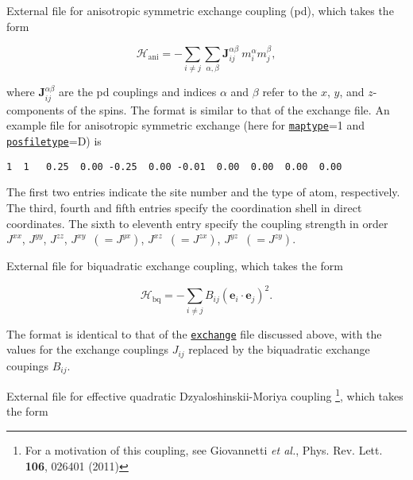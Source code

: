 \documentclass[11pt,fleqn,a4]{book} %
\makeatletter
\newcommand{\litem}[1]{\item[\bfseries#1\index{#1@\texttt{#1}}\label{#1}]}
\newcommand{\rkeyword}[1]{\hyperref[#1]{\texttt{#1}}}
\makeatother
\begin{document}
\begin{description}[leftmargin=!,labelwidth=\widthof{\bfseries fifteenchars}]
\litem{pd} External file for anisotropic symmetric exchange coupling (pd), which takes the form 

\begin{declaration} 
\begin{equation}
\mathcal{H}_{\mathrm{ani}} = -\sum_{i\neq j} \sum_{\alpha,\beta}\mathbf{J}_{ij}^{\alpha \beta} \ m_i^{\alpha} m_j^{\beta},
  \label{pd_ham}
\end{equation}
\end{declaration}

\noindent where $\mathbf{J}_{ij}^{\alpha \beta}$ are the pd couplings and indices $\alpha$ and $\beta$ refer to the $x$, $y$, and $z$-components of the spins. The format is similar to that of the exchange file.  An example file for anisotropic symmetric exchange (here for \rkeyword{maptype}=1 and \rkeyword{posfiletype}=D) is

\begin{fBox} 
\begin{Verbatim}
1  1   0.25  0.00 -0.25  0.00 -0.01  0.00  0.00  0.00  0.00  
\end{Verbatim}
\end{fBox}

The first two entries indicate the site number and the type of atom, respectively. The third, fourth and fifth entries specify the coordination shell in direct coordinates. The sixth to eleventh entry specify the coupling strength in order $J^{xx}$, $J^{yy}$, $J^{zz}$, $J^{xy}$~$(=J^{yx})$, $J^{xz}$~$(=J^{zx})$, $J^{yz}$~$(=J^{zy})$.

\litem{bq} External file for biquadratic exchange coupling, which takes the form  

\begin{declaration}
\begin{equation}
 \mathcal{H}_{\mathrm{bq}} = -\sum_{i\neq j}B_{ij} \left( \mathbf{e}_i\cdot\mathbf{e}_j \right)^2.
  \label{bq_ham}
\end{equation}
\end{declaration}

\noindent The format is identical to that of the \rkeyword{exchange} file discussed above, with the values for the exchange couplings $J_{ij}$ replaced by the biquadratic exchange coupings $B_{ij}$. 

\litem{biqdm} External file for effective quadratic Dzyaloshinskii-Moriya coupling \footnote{For a motivation of this coupling, see Giovannetti \textit{et al.}, Phys. Rev. Lett. \textbf{106}, 026401 (2011)}, which takes the form 


\end{description}
\end{document}
